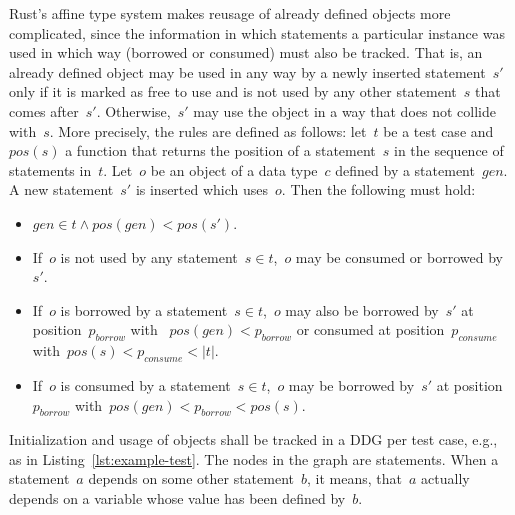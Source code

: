 \documentclass{article}
\begin{document}
Rust's affine type system makes reusage of already defined objects more complicated, since the information in which statements a particular instance was used in which way (borrowed or consumed) must also be tracked. That is, an already defined object may be used in any way by a newly inserted statement~$s'$ only if it is marked as free to use and is not used by any other statement~$s$ that comes after~$s'$. Otherwise,~$s'$ may use the object in a way that does not collide with~$s$. More precisely, the rules are defined as follows: let~$t$ be a test case and $pos(s)$ a function that returns the position of a statement~$s$ in the sequence of statements in~$t$. Let~$o$ be an object of a data type~$c$ defined by a statement~$gen$. A new statement~$s'$ is inserted which uses~$o$. Then the following must hold:
\begin{itemize}
    \item $gen \in t \wedge pos(gen) < pos(s')$.
    \item If~$o$ is not used by any statement~$s \in t$,~$o$ may be consumed or borrowed by~$s'$. 
    \item If~$o$ is borrowed by a statement~$s \in t$,~$o$ may also be borrowed by~$s'$ at position~$p_{borrow}$ with ~$pos(gen) < p_{borrow}$ or consumed at position~$p_{consume}$ with~$pos(s) < p_{consume} < \left|t\right|$. 
    \item If~$o$ is consumed by a statement~$s \in t$,~$o$ may be borrowed by~$s'$ at position~$p_{borrow}$ with~$pos(gen) < p_{borrow} < pos(s)$. 
\end{itemize}

Initialization and usage of objects shall be tracked in a \ac{DDG} per test case, e.g., as in Listing~\ref{lst:example-test}. The nodes in the graph are statements. When a statement~$a$ depends on some other statement~$b$, it means, that~$a$ actually depends on a variable whose value has been defined by~$b$. 
\end{document}
